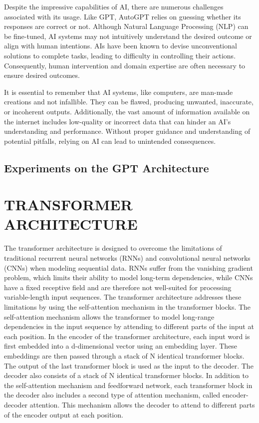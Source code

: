 \documentclass[letterpaper, 10pt, conference]{ieeeconf}
\begin{document}
        Despite the impressive capabilities of AI, there are numerous challenges associated with its usage. Like GPT, AutoGPT relies on guessing whether its responses are correct or not. Although Natural Language Processing (NLP) can be fine-tuned, AI systems may not intuitively understand the desired outcome or align with human intentions. AIs have been known to devise unconventional solutions to complete tasks, leading to difficulty in controlling their actions. Consequently, human intervention and domain expertise are often necessary to ensure desired outcomes\cite{miles2022}.
        
        It is essential to remember that AI systems, like computers, are man-made creations and not infallible. They can be flawed, producing unwanted, inaccurate, or incoherent outputs. Additionally, the vast amount of information available on the internet includes low-quality or incorrect data that can hinder an AI's understanding and performance. Without proper guidance and understanding of potential pitfalls, relying on AI can lead to unintended consequences.

    \subsection{Experiments on the GPT Architecture}
        

    \section{TRANSFORMER ARCHITECTURE}

    The transformer architecture is designed to overcome the limitations of traditional recurrent neural networks (RNNs) and
    convolutional neural networks (CNNs) when modeling sequential data. RNNs suffer from the vanishing gradient problem, which
    limits their ability to model long-term dependencies, while CNNs have a fixed receptive field and are therefore not well-suited for
    processing variable-length input sequences.
    The transformer architecture addresses these limitations by using the self-attention mechanism in the transformer blocks.
    The self-attention mechanism allows the transformer to model long-range dependencies in the input sequence by attending to
    different parts of the input at each position.
    In the encoder of the transformer architecture, each input word is first embedded into a d-dimensional vector using an
    embedding layer. These embeddings are then passed through a stack of N identical transformer blocks. The output of the last
    transformer block is used as the input to the decoder.
    The decoder also consists of a stack of N identical transformer blocks. In addition to the self-attention mechanism and
    feedforward network, each transformer block in the decoder also includes a second type of attention mechanism, called encoder-decoder attention. This mechanism allows the decoder to attend to different parts of the encoder output at each position.
       
\end{document}
